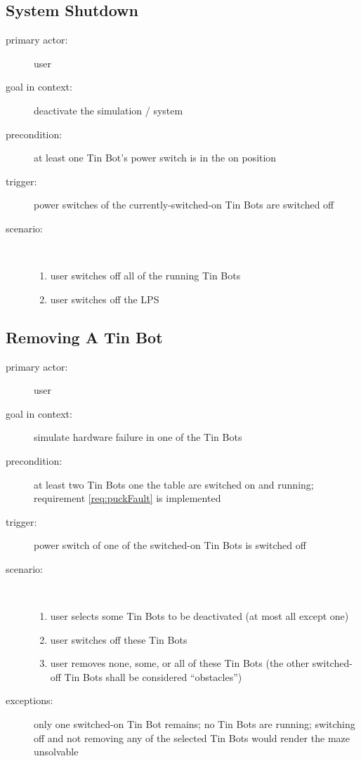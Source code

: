 \documentclass[a4paper,parskip,headheight=38pt]{scrartcl} %
\begin{document}
\subsection{System Shutdown}
\begin{description}
\item[primary actor:] user
\item[goal in context:] deactivate the simulation / system
\item[precondition:] at least one Tin Bot's power switch is in the on position
\item[trigger:] power switches of the currently-switched-on Tin Bots are switched off
\item[scenario:] \ 
\begin{enumerate}
	\item user switches off all of the running Tin Bots
	\item user switches off the LPS
\end{enumerate}
\end{description}

\subsection{Removing A Tin Bot}
\begin{description}
\item[primary actor:] user
\item[goal in context:] simulate hardware failure in one of the Tin Bots
\item[precondition:] at least two Tin Bots one the table are switched on and running; requirement \ref{req:puckFault} is implemented
\item[trigger:] power switch of one of the switched-on Tin Bots is switched off
\item[scenario:] \ 
\begin{enumerate}
	\item user selects some Tin Bots to be deactivated (at most all except one)
	\item user switches off these Tin Bots
	\item user removes none, some, or all of these Tin Bots (the other switched-off Tin Bots shall be considered \enquote{obstacles})
\end{enumerate}
\item[exceptions:] only one switched-on Tin Bot remains; no Tin Bots are running; switching off and not removing any of the selected Tin Bots would render the maze unsolvable
\end{description}
\end{document}
